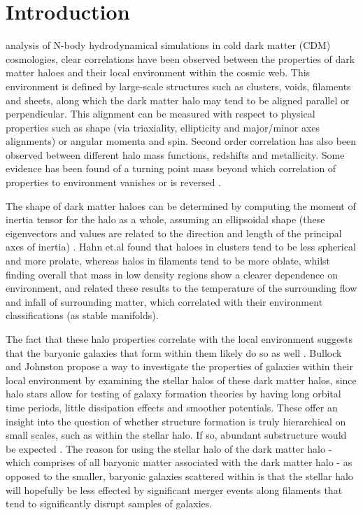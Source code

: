 \documentclass[journal]{IEEEtran}
\begin{document}
\IEEEpeerreviewmaketitle

\section{Introduction}
 analysis of N-body hydrodynamical simulations in cold dark matter (CDM) cosmologies, clear correlations have been observed between the properties of dark matter haloes and their local environment within the cosmic web. This environment is defined by large-scale structures such as clusters, voids, filaments and sheets, along which the dark matter halo may tend to be aligned parallel or perpendicular. This alignment can be measured with respect to physical properties such as shape (via triaxiality, ellipticity and major/minor axes alignments) or angular momenta and spin. Second order correlation has also been observed between different halo mass functions, redshifts and metallicity. Some evidence has been found of a turning point mass beyond which correlation of properties to environment vanishes or is reversed \cite{hahn07b} \cite{dubois14}. 

The shape of dark matter haloes can be determined by computing the moment of inertia tensor for the halo as a whole, assuming an ellipsoidal shape (these eigenvectors and values are related to the direction and length of the principal axes of inertia) \cite{hahn07a}. Hahn et.al \cite{hahn07a} found that haloes in clusters tend to be less spherical and more prolate, whereas halos in filaments tend to be more oblate, whilst finding overall that mass in low density regions show a clearer dependence on environment, and related these results to the temperature of the surrounding flow and infall of surrounding matter, which correlated with their environment classifications (as stable manifolds). 

The fact that these halo properties correlate with the local environment suggests that the baryonic galaxies that form within them likely do so as well \cite{hahn07b}.  Bullock and Johnston \cite{bullock05} propose a way to investigate the properties of galaxies within their local environment by examining the stellar halos of these dark matter halos, since halo stars allow for testing of galaxy formation theories by having long orbital time periods, little dissipation effects and smoother potentials. These offer an insight into the question of whether structure formation is truly hierarchical on small scales, such as within the stellar halo. If so, abundant substructure would be expected \cite{bullock05}. The reason for using the stellar halo of the dark matter halo - which comprises of all baryonic matter associated with the dark matter halo - as opposed to the smaller, baryonic galaxies scattered within is that the stellar halo will hopefully be less effected by significant merger events along filaments that tend to significantly disrupt samples of galaxies.
\end{document}
